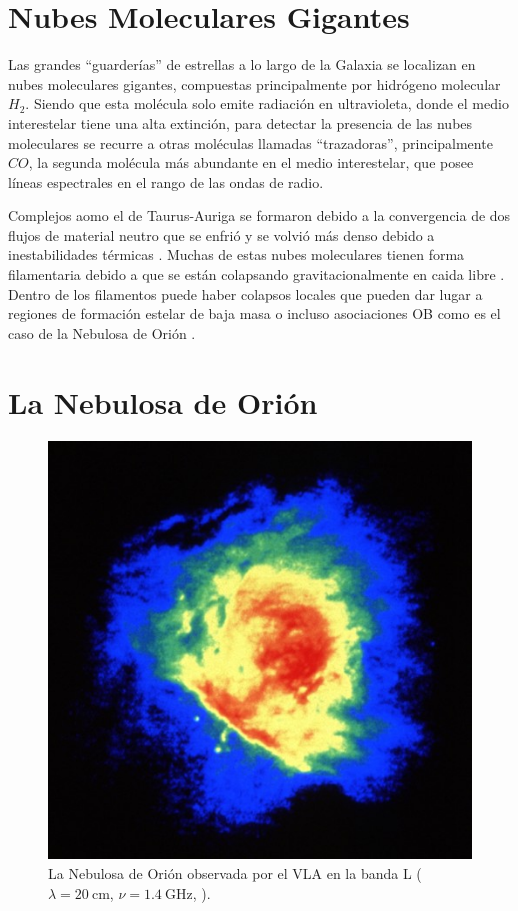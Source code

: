 \section{Nubes Moleculares Gigantes}

Las grandes ``guarderías'' de estrellas a lo largo de la Galaxia se localizan en nubes moleculares gigantes, compuestas principalmente por hidrógeno molecular $H_2$.
Siendo que esta molécula solo emite radiación en ultravioleta, donde el medio interestelar tiene una alta extinción, para detectar la presencia de las nubes moleculares se recurre a otras moléculas llamadas ``trazadoras'', principalmente $CO$, la segunda molécula más abundante en el medio interestelar, que posee líneas espectrales en el rango de las ondas de radio.

Complejos aomo el de Taurus-Auriga se formaron debido a la convergencia de dos flujos de material neutro \citep{Ballesteros:1999} que se enfrió y se volvió más denso debido a inestabilidades térmicas \citep{Hennebelle:1999}. Muchas de estas nubes moleculares tienen forma filamentaria debido a que se están colapsando gravitacionalmente en caida libre \citep{Ballesteros:2011}. Dentro de los filamentos puede haber colapsos locales que pueden dar lugar a regiones de formación estelar de baja masa o incluso asociaciones OB como es el caso de la Nebulosa de Orión \citep{Hartmann:2007}.

\section{La Nebulosa de Orión}

\begin{figure}
    \includegraphics[width=0.7\linewidth]{./Figures/OrionVR13A} 
  \caption{La Nebulosa de Orión observada por el VLA en la banda L ($\lambda = 20\mathrm{~cm}$, $\nu = 1.4\mathrm{~GHz}$, \citet{Yusef:1990}).}
\end{figure}

